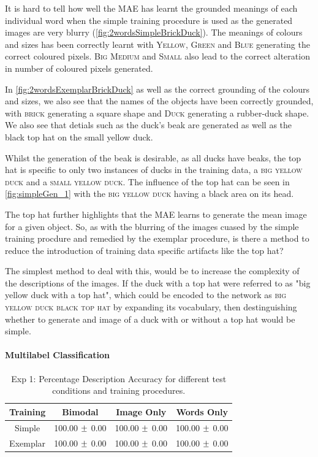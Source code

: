 It is hard to tell how well the MAE has learnt the grounded meanings of each individual word when the simple training procedure is used as the generated images are very blurry (\autoref{fig:2wordsSimpleBrickDuck}). The meanings of colours and sizes has been correctly learnt with \textsc{Yellow}, \textsc{Green} and  \textsc{Blue} generating the correct coloured pixels. \textsc{Big} \textsc{Medium} and \textsc{Small} also lead to the correct alteration in number of coloured pixels generated.

In \autoref{fig:2wordsExemplarBrickDuck} as well as the correct grounding of the colours and sizes, we also see that the names of the objects have been correctly grounded, with \textsc{brick} generating a square shape and \textsc{Duck} generating a rubber-duck shape. We also see that detials such as the duck's beak are generated as well as the black top hat on the small yellow duck.

Whilst the generation of the beak is desirable, as all ducks have beaks, the top hat is specific to only two instances of ducks in the training data, a \textsc{big yellow duck} and a \textsc{small yellow duck}. The influence of the top hat can be seen in \autoref{fig:simpleGen_1} with the 
\textsc{big yellow duck} having a black area on its head.

The top hat further highlights that the MAE learns to generate the mean image for a given object. So, as with the blurring of the images cuased by the simple training procdure and remedied by the exemplar procedure, is there a method to reduce the introduction of training data specific artifacts like the top hat?

The simplest method to deal with this, would be to increase the complexity of the descriptions of the images. If the duck with a top hat were referred to as "big yellow duck with a top hat", which could be encoded to the network as \textsc{big yellow duck black top hat} by expanding its vocabulary, then destinguishing whether to generate and image of a duck with or without a top hat would be simple.


\paragraph{Multilabel Classification}


\begin{table}[h!]
\centering
	\begin{tabular}{|c|c|c|c|}
	\hline
\textbf{Training }	 & 	\textbf{Bimodal} & \textbf{Image Only} 	& 	\textbf{Words Only} \\ \hline
Simple & 100.00 $\mypm$ 0.00 & 100.00 $\mypm$ 0.00 & 100.00 $\mypm$ 0.00 \\ \hline
Exemplar & 100.00 $\mypm$ 0.00 & 100.00 $\mypm$ 0.00 & 100.00 $\mypm$ 0.00 \\ \hline
	\end{tabular}
\caption{Exp 1: Percentage Description Accuracy for different test conditions and training procedures.}
\label{tab:6_res_exp1_acc}
\end{table}

